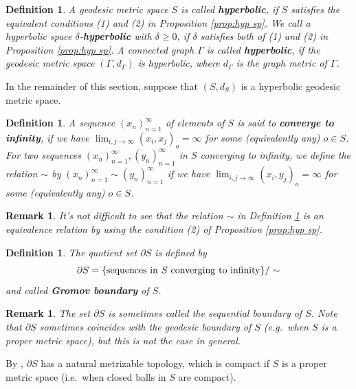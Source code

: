 \documentclass{article}[11pt]
\newtheorem{defn}[thm]{Definition}
\newtheorem{rem}[thm]{Remark}
\begin{document}
{\begin{defn}
    A geodesic metric space $S$ is called \textbf{hyperbolic}, if $S$ satisfies the equivalent conditions (1) and (2) in Proposition \ref{prop:hyp sp}. We call a hyperbolic space $\delta$-\textbf{hyperbolic} with $\delta \geq 0$, if $\delta$ satisfies both of (1) and (2) in Proposition \ref{prop:hyp sp}. A connected graph $\Gamma$ is called \textbf{hyperbolic}, if the geodesic metric space $(\Gamma,d_\Gamma)$ is hyperbolic, where $d_\Gamma$ is the graph metric of $\Gamma$.
\end{defn}

In the remainder of this section, suppose that $(S,d_S)$ is a hyperbolic geodesic metric space.

\begin{defn}\label{def:seq to infty}
    A sequence $(x_n)_{n=1}^\infty$ of elements of $S$ is said to \textbf{converge to infinity}, if we have $\lim_{i,j\to\infty} (x_i,x_j)_o =\infty$ for some (equivalently any) $o\in S$. For two sequences $(x_n)_{n=1}^\infty,(y_n)_{n=1}^\infty$ in $S$ converging to infinity, we define the relation $\sim$ by $(x_n)_{n=1}^\infty \sim (y_n)_{n=1}^\infty$ if we have $\lim_{i,j\to\infty} (x_i,y_j)_o =\infty$ for some (equivalently any) $o\in S$.
\end{defn}

\begin{rem}
    It's not difficult to see that the relation $\sim$ in Definition \ref{def:seq to infty} is an equivalence relation by using the condition (2) of Proposition \ref{prop:hyp sp}.
\end{rem}

\begin{defn}
    The quotient set $\partial S$ is defined by
    \[
    \partial S = \{ {\rm sequences~in~ }S {\rm ~converging~to~infinity} \} / \sim
    \]
    and called \textbf{Gromov boundary} of $S$.
\end{defn}

\begin{rem}
    The set $\partial S$ is sometimes called the sequential boundary of $S$. Note that $\partial S$ sometimes coincides with the geodesic boundary of $S$ (e.g.\ when $S$ is a proper metric space), but this is not the case in general.
\end{rem}

By \cite[Proposition III.H.3.21]{BH99}, $\partial S$ has a natural metrizable topology, which is compact if $S$ is a proper metric space (i.e.\ when closed balls in $S$ are compact). 

}
\end{document}
